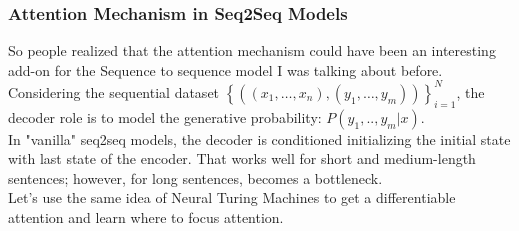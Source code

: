 \subsubsection{Attention Mechanism in Seq2Seq Models}
So people realized that the attention mechanism could have been an interesting add-on for the Sequence to sequence model I was talking about before. \\


Considering the sequential dataset $
\left\{\left(\left(x_{1}, \dots, x_{n}\right),\left(y_{1}, \dots, y_{m}\right)\right)\right\}_{i=1}^{N}
$, the decoder role is to model the generative probability: $P(y_1, ..,y_m | x)$.\\
In "vanilla" seq2seq models, the decoder is conditioned initializing the initial state with last state of the encoder. That works well for short and medium-length sentences; however, for long sentences, becomes a bottleneck.\\
Let's use the same idea of Neural Turing Machines to get a differentiable attention and learn where to focus attention.\\ 

